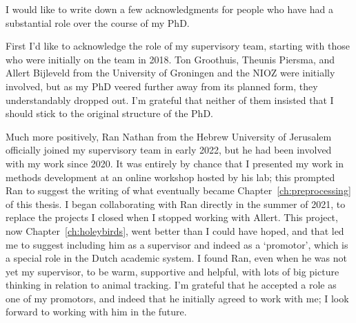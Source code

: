 \label{ch:ack}


\bigskip

\begingroup
\let\clearpage\relax
\let\cleardoublepage\relax
\let\cleardoublepage\relax

I would like to write down a few acknowledgments for people who have had a substantial role over the course of my PhD.

First I'd like to acknowledge the role of my supervisory team, starting with those who were initially on the team in 2018.
Ton Groothuis, Theunis Piersma, and Allert Bijleveld from the University of Groningen and the NIOZ were initially involved, but as my PhD veered further away from its planned form, they understandably dropped out.
I'm grateful that neither of them insisted that I should stick to the original structure of the PhD.

Much more positively, Ran Nathan from the Hebrew University of Jerusalem officially joined my supervisory team in early 2022, but he had been involved with my work since 2020.
It was entirely by chance that I presented my work in methods development at an online workshop hosted by his lab; this prompted Ran to suggest the writing of what eventually became Chapter~\ref{ch:preprocessing} of this thesis.
I began collaborating with Ran directly in the summer of 2021, to replace the projects I closed when I stopped working with Allert.
This project, now Chapter~\ref{ch:holeybirds}, went better than I could have hoped, and that led me to suggest including him as a supervisor and indeed as a `promotor', which is a special role in the Dutch academic system.
I found Ran, even when he was not yet my supervisor, to be warm, supportive and helpful, with lots of big picture thinking in relation to animal tracking.
I'm grateful that he accepted a role as one of my promotors, and indeed that he initially agreed to work with me; I look forward to working with him in the future.

